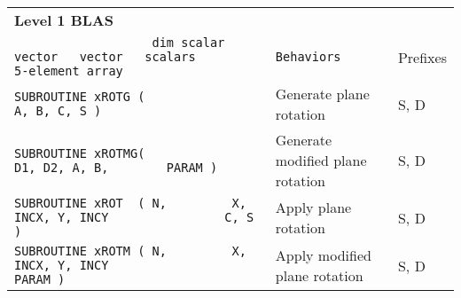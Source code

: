 \documentclass[10pt,a3paper, landscape]{article}
\begin{document}
	\pagestyle{empty}
	\centering
	
	\hspace{0.5cm}
	\begin{tabular}{ll>{\ttfamily}l}
		\multicolumn{3}{l}{\Large{\textbf{Level 1 BLAS}}}                                                                                                                                                                                                                                                                                                                                    \\
		\verb|                   dim scalar vector   vector   scalars              5-element array     | & \texttt{Behaviors}                                                                                                                                                                                                                                           & Prefixes           \\
		\verb|SUBROUTINE xROTG (                                      A, B, C, S )                     | & Generate plane rotation                                                                                                                                                                                                                                      & S, D               \\
		\verb|SUBROUTINE xROTMG(                              D1, D2, A, B,        PARAM )             | & Generate modified plane rotation                                                                                                                                                                                                                             & S, D               \\
		\verb|SUBROUTINE xROT  ( N,         X, INCX, Y, INCY                C, S )                     | & Apply plane rotation                                                                                                                                                                                                                                         & S, D               \\
		\verb|SUBROUTINE xROTM ( N,         X, INCX, Y, INCY                       PARAM )             | & Apply modified plane rotation                                                                                                                                                                                                                                & S, D               \\

\end{tabular}
\end{document}
